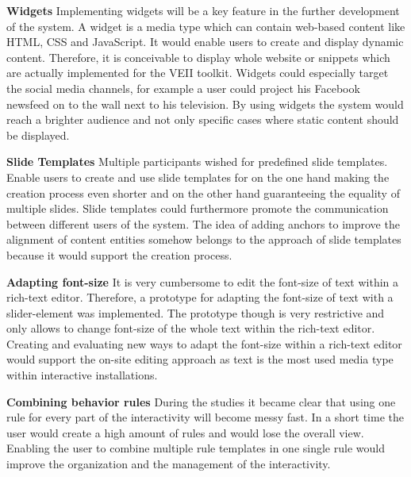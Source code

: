 \textbf{Widgets}
\newline
Implementing widgets will be a key feature in the further development of the system. A widget is a media type which can contain web-based content like HTML, CSS and JavaScript. It would enable users to create and display dynamic content. Therefore, it is conceivable to display whole website or snippets which are actually implemented for the VEII toolkit. Widgets could especially target the social media channels, for example a user could project his Facebook newsfeed on to the wall next to his television. By using widgets the system would reach a brighter audience and not only specific cases where static content should be displayed.
\newline

\textbf{Slide Templates}
\newline
Multiple participants wished for predefined slide templates. Enable users to create and use slide templates for on the one hand making the creation process even shorter and on the other hand guaranteeing the equality of multiple slides. Slide templates could furthermore promote the communication between different users of the system. The idea of adding anchors to improve the alignment of content entities somehow belongs to the approach of slide templates because it would support the creation process.
\newline

\textbf{Adapting font-size}
\newline
It is very cumbersome to edit the font-size of text within a rich-text editor. Therefore, a prototype for adapting the font-size of text with a slider-element was implemented. The prototype though is very restrictive and only allows to change font-size of the whole text within the rich-text editor. Creating and evaluating new ways to adapt the font-size within a rich-text editor would support the on-site editing approach as text is the most used media type within interactive installations.

\textbf{Combining behavior rules}
\newline
During the studies it became clear that using one rule for every part of the interactivity will become messy fast. In a short time the user would create a high amount of rules and would lose the overall view. Enabling the user to combine multiple rule templates in one single rule would improve the organization and the management of the interactivity.
\newline


